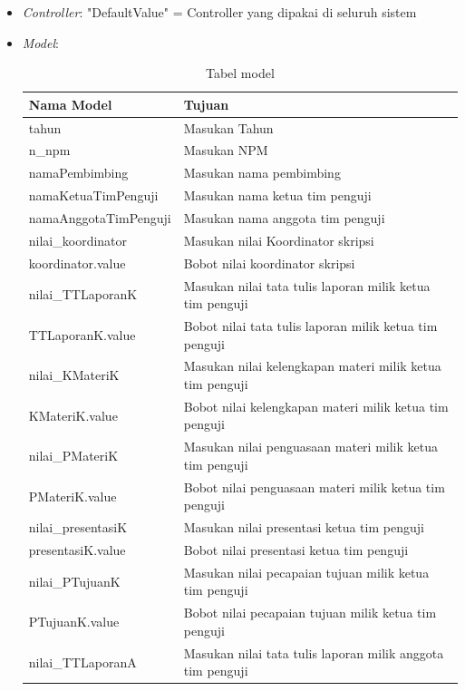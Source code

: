 	\begin{itemize}
		\item \textit{Controller}: "DefaultValue" = Controller yang dipakai di seluruh sistem
		\item \textit{Model}:\\
		\begin{table}[H]
			\centering
			\caption{Tabel model}
			\label{tabel: model}
		\begin{tabular}{| m{5cm} | m{10cm} |}
			\hline
			Nama Model & Tujuan\\
			\hline
			 tahun & Masukan Tahun\\
			\hline
			 n\_npm & Masukan NPM\\
			\hline
			namaPembimbing & Masukan nama pembimbing\\
			\hline
			namaKetuaTimPenguji & Masukan nama ketua tim penguji\\
			\hline
			namaAnggotaTimPenguji & Masukan nama anggota tim penguji\\
			\hline
			 nilai\_koordinator & Masukan nilai Koordinator skripsi\\
			 \hline
			 koordinator.value & Bobot nilai koordinator skripsi\\
			\hline
			 nilai\_TTLaporanK & Masukan nilai tata tulis laporan milik ketua tim penguji\\
			 \hline
			 TTLaporanK.value & Bobot nilai tata tulis laporan milik ketua tim penguji\\
			\hline
			 nilai\_KMateriK & Masukan nilai kelengkapan materi milik ketua tim penguji\\
			\hline
			 KMateriK.value & Bobot nilai kelengkapan materi milik ketua tim penguji\\
			 \hline
			 nilai\_PMateriK & Masukan nilai penguasaan materi milik ketua tim penguji\\
			 \hline
			 PMateriK.value & Bobot nilai penguasaan materi milik ketua tim penguji\\
			\hline
			 nilai\_presentasiK& Masukan nilai presentasi ketua tim penguji\\
			 \hline
			 presentasiK.value & Bobot nilai presentasi ketua tim penguji\\
			\hline
			 nilai\_PTujuanK & Masukan nilai pecapaian tujuan milik ketua tim penguji\\
			\hline
			PTujuanK.value & Bobot nilai pecapaian tujuan milik ketua tim penguji\\
			\hline
			 nilai\_TTLaporanA & Masukan nilai tata tulis laporan milik anggota tim penguji\\

\end{tabular}
\end{table}
\end{itemize}

